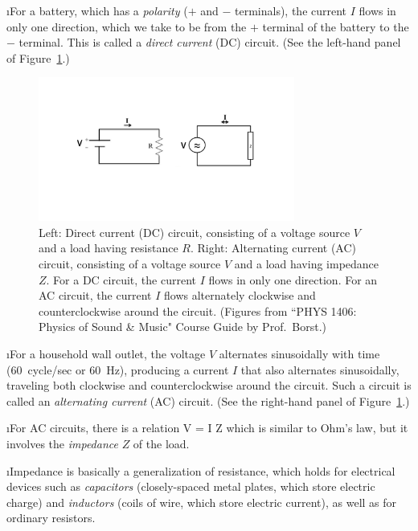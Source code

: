 \i For a battery, which has a {\em polarity} ($+$ and 
$-$ terminals), the current $I$ flows in only one direction, 
which we take to be from the $+$ terminal of the battery 
to the $-$ terminal.
This is called a {\em direct current} (DC) circuit.
(See the left-hand panel of Figure~\ref{f:circuits_DC_AC}.)
%
\begin{figure}[htbp]
\begin{center}
\includegraphics[width=0.75\textwidth]{circuits_DC_AC}
\caption{Left: Direct current (DC) circuit, consisting
of a voltage source $V$ and a load having resistance $R$.
Right: Alternating current (AC) circuit, consisting of
a voltage source $V$ and a load having impedance $Z$.
For a DC circuit, the current $I$ flows in only one direction.
For an AC circuit, the current $I$ flows alternately clockwise and
counterclockwise around the circuit.
(Figures from ``PHYS 1406: Physics of Sound \& Music" 
Course Guide by Prof.~Borst.)}
\label{f:circuits_DC_AC}
\end{center}
\end{figure}

\i For a household wall outlet, the voltage $V$ alternates
sinusoidally with time (60~cycle/sec or 60~Hz), 
producing a current $I$ that 
also alternates sinusoidally, traveling both clockwise and 
counterclockwise around the circuit.
Such a circuit is called an {\em alternating current} (AC) circuit.
(See the right-hand panel of Figure~\ref{f:circuits_DC_AC}.)

\i For AC circuits, there is a relation 
%
\be
V = I Z
\ee
%
which is similar to Ohm's law, but it involves the {\em impedance}
$Z$ of the load.

\i Impedance is basically a generalization of resistance, which holds
for electrical devices such as {\em capacitors} (closely-spaced metal 
plates, which store electric charge) and {\em inductors} (coils of wire, 
which store electric current), as well as for ordinary resistors.

